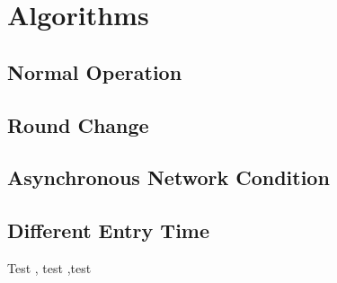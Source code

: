 \chapter{Algorithms}
\label{c:algo}

\section{Normal Operation}
\section{Round Change}
\section{Asynchronous Network Condition}
\section{Different Entry Time}
Test \cite{AdaptivePortfolioTradingSystem,OpenAIGym,Sharpe49}, test ,test
